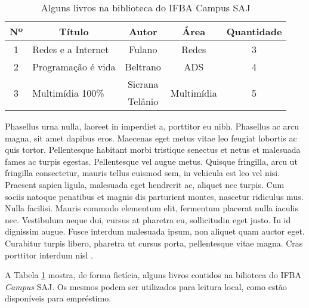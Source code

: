 \documentclass[tec, ads, scr, classic, a4paper,twoside]{ifbatcc}
\begin{document}
\begin{table}[h]
\begin{center}
\caption{Alguns livros na biblioteca do IFBA Campus SAJ}
\label{tabela:livros}
\begin{adjustbox}{max width=\textwidth}
\begin{tabular}{clccc}
\toprule
\textbf{Nº} & \multicolumn{1}{c}{\textbf{Título}} & \textbf{Autor} & \textbf{Área} & \textbf{Quantidade} \\ 
\toprule 
                   1   & Redes e a Internet                 & Fulano         & Redes                          & 3                  \\ \midrule
                   2   & Programação é vida                 & Beltrano       & ADS                            & 4                  \\ \midrule
  \multirow{2}{*}{3}   & \multirow{2}{*}{Multimídia 100\%}  & Sicrana        & \multirow{2}{*}{Multimídia}    & \multirow{2}{*}{5} \\ 
                       &                                    & Telânio        &                                & \\   
\bottomrule
\end{tabular}
\end{adjustbox}
\end{center}
\end{table}

Phasellus urna nulla, laoreet in imperdiet a, porttitor eu nibh. Phasellus ac arcu magna, sit amet dapibus eros. Maecenas eget metus vitae leo feugiat lobortis ac quis tortor. Pellentesque habitant morbi tristique senectus et netus et malesuada fames ac turpis egestas. Pellentesque vel augue metus. Quisque fringilla, arcu ut fringilla consectetur, mauris tellus euismod sem, in vehicula est leo vel nisi. Praesent sapien ligula, malesuada eget hendrerit ac, aliquet nec turpis. Cum sociis natoque penatibus et magnis dis parturient montes, nascetur ridiculus mus. Nulla facilisi. Mauris commodo elementum elit, fermentum placerat nulla iaculis nec. Vestibulum neque dui, cursus at pharetra eu, sollicitudin eget justo. In id dignissim augue. Fusce interdum malesuada ipsum, non aliquet quam auctor eget. Curabitur turpis libero, pharetra ut cursus porta, pellentesque vitae magna. Cras porttitor  interdum nisl .

A Tabela \ref{tabela:livros} mostra, de forma fictícia, alguns livros contidos na bilioteca do IFBA \textit{Campus} SAJ. Os mesmos podem ser utilizados para leitura local, como estão disponíveis para empréstimo.
\end{document}
